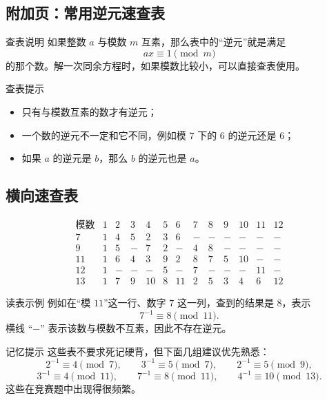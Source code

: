 \documentclass[11pt,a4paper,fontset=fandol]{ctexart}
\theoremstyle{formaltheorem}
\theoremstyle{formalexample}
\begin{document}
\begin{landscape}
\newpage
\section{附加页：常用逆元速查表}

\begin{goalbox}{查表说明}
如果整数 $a$ 与模数 $m$ 互素，那么表中的“逆元”就是满足
\[
ax\equiv 1\pmod m
\]
的那个数。解一次同余方程时，如果模数比较小，可以直接查表使用。
\end{goalbox}

\begin{notebox}{查表提示}
\begin{itemize}
  \item 只有与模数互素的数才有逆元；
  \item 一个数的逆元不一定和它不同，例如模 $7$ 下的 $6$ 的逆元还是 $6$；
  \item 如果 $a$ 的逆元是 $b$，那么 $b$ 的逆元也是 $a$。
\end{itemize}
\end{notebox}

\subsection*{横向速查表}

\[
\renewcommand{\arraystretch}{1.35}
\begin{array}{c|cccccccccccc}
\text{模数} & 1 & 2 & 3 & 4 & 5 & 6 & 7 & 8 & 9 & 10 & 11 & 12 \\
\hline
7  & 1 & 4 & 5 & 2 & 3 & 6 & - & - & - & - & - & - \\
9  & 1 & 5 & - & 7 & 2 & - & 4 & 8 & - & - & - & - \\
11 & 1 & 6 & 4 & 3 & 9 & 2 & 8 & 7 & 5 & 10 & - & - \\
12 & 1 & - & - & - & 5 & - & 7 & - & - & - & 11 & - \\
13 & 1 & 7 & 9 & 10 & 8 & 11 & 2 & 5 & 3 & 4 & 6 & 12
\end{array}
\]

\begin{notebox}{读表示例}
例如在“模 $11$”这一行、数字 $7$ 这一列，查到的结果是 $8$，表示
\[
7^{-1}\equiv 8\pmod{11}.
\]
横线 “$-$” 表示该数与模数不互素，因此不存在逆元。
\end{notebox}

\begin{notebox}{记忆提示}
这些表不要求死记硬背，但下面几组建议优先熟悉：
\[
2^{-1}\equiv 4\pmod 7,\qquad
3^{-1}\equiv 5\pmod 7,\qquad
2^{-1}\equiv 5\pmod 9,
\]
\[
3^{-1}\equiv 4\pmod{11},\qquad
7^{-1}\equiv 8\pmod{11},\qquad
4^{-1}\equiv 10\pmod{13}.
\]
这些在竞赛题中出现得很频繁。
\end{notebox}
\end{landscape}
\end{document}
